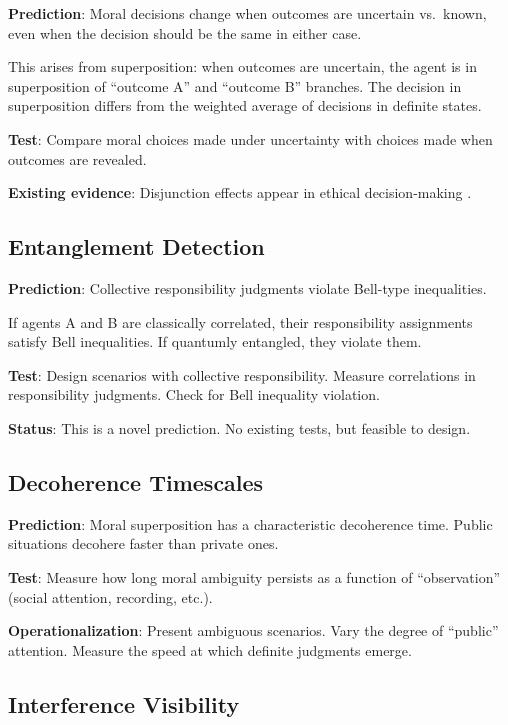 \documentclass[12pt]{article}
\begin{document}
\textbf{Prediction}: Moral decisions change when outcomes are uncertain vs.\ known, even when the decision should be the same in either case.

This arises from superposition: when outcomes are uncertain, the agent is in superposition of ``outcome A'' and ``outcome B'' branches. The decision in superposition differs from the weighted average of decisions in definite states.

\textbf{Test}: Compare moral choices made under uncertainty with choices made when outcomes are revealed.

\textbf{Existing evidence}: Disjunction effects appear in ethical decision-making \cite{tversky1992}.

\subsection{Entanglement Detection}

\textbf{Prediction}: Collective responsibility judgments violate Bell-type inequalities.

If agents A and B are classically correlated, their responsibility assignments satisfy Bell inequalities. If quantumly entangled, they violate them.

\textbf{Test}: Design scenarios with collective responsibility. Measure correlations in responsibility judgments. Check for Bell inequality violation.

\textbf{Status}: This is a novel prediction. No existing tests, but feasible to design.

\subsection{Decoherence Timescales}

\textbf{Prediction}: Moral superposition has a characteristic decoherence time. Public situations decohere faster than private ones.

\textbf{Test}: Measure how long moral ambiguity persists as a function of ``observation'' (social attention, recording, etc.).

\textbf{Operationalization}: Present ambiguous scenarios. Vary the degree of ``public'' attention. Measure the speed at which definite judgments emerge.

\subsection{Interference Visibility}
\end{document}
